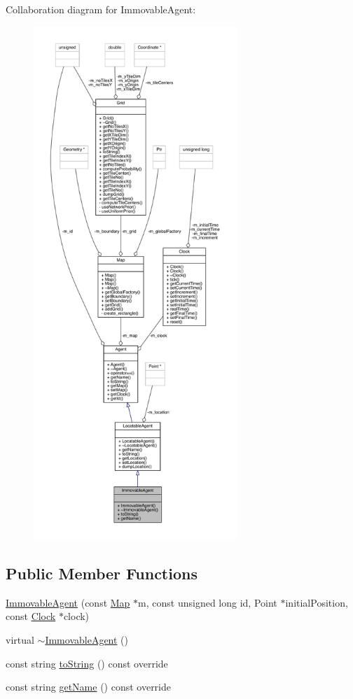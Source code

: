 Collaboration diagram for Immovable\+Agent\+:\nopagebreak
\begin{figure}[H]
\begin{center}
\leavevmode
\includegraphics[height=550pt]{class_immovable_agent__coll__graph}
\end{center}
\end{figure}
\subsection*{Public Member Functions}
\begin{DoxyCompactItemize}
\item 
\mbox{\hyperlink{class_immovable_agent_a0b4253828510a7212b77c5921a057900}{Immovable\+Agent}} (const \mbox{\hyperlink{class_map}{Map}} $\ast$m, const unsigned long id, Point $\ast$initial\+Position, const \mbox{\hyperlink{class_clock}{Clock}} $\ast$clock)
\item 
virtual \mbox{\hyperlink{class_immovable_agent_aa2dfb26891059da00ff897a7c6e6a47c}{$\sim$\+Immovable\+Agent}} ()
\item 
const string \mbox{\hyperlink{class_immovable_agent_a805b0d18035550d902d617a8c7ccc062}{to\+String}} () const override
\item 
const string \mbox{\hyperlink{class_immovable_agent_ae8fbccc744f6f806e47dfd242fa67a1c}{get\+Name}} () const override
\end{DoxyCompactItemize}


